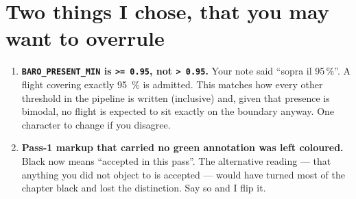 \documentclass[11pt,a4paper]{article}
\begin{document}
\section{Two things I chose, that you may want to overrule}

\begin{enumerate}[leftmargin=1.4em, itemsep=0.4em]
  \item \textbf{\texttt{BARO\_PRESENT\_MIN} is \texttt{>= 0.95}, not \texttt{> 0.95}.} Your
    note said \enquote{sopra il 95\,\%}. A flight covering exactly \SI{95}{\percent} is
    admitted. This matches how every other threshold in the pipeline is written (inclusive)
    and, given that presence is bimodal, no flight is expected to sit exactly on the
    boundary anyway. One character to change if you disagree.
  \item \textbf{Pass-1 markup that carried no green annotation was left coloured.} Black now
    means \enquote{accepted in this pass}. The alternative reading --- that anything you did
    not object to is accepted --- would have turned most of the chapter black and lost the
    distinction. Say so and I flip it.
\end{enumerate}
\end{document}
